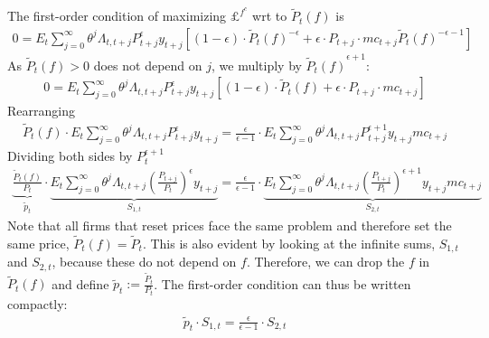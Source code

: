 \begin{enumerate}
The first-order condition of maximizing \(\pounds^{f^c}\) wrt to \(\widetilde{P}_t(f)\) is
\begin{align}
	0= E_t \sum_{j=0}^{\infty}\theta^j \Lambda_{t,t+j} P_{t+j}^\epsilon y_{t+j} \left[ (1-\epsilon)\cdot \widetilde{P}_{t}(f)^{-\epsilon}  +\epsilon \cdot P_{t+j} \cdot mc_{t+j} \widetilde{P}_{t}(f)^{-\epsilon-1}\right]
\end{align}
As \(\widetilde{P}_t(f)>0\) does not depend on \(j\), we multiply by \({\widetilde{P}_t(f)}^{\epsilon+1}\):
\begin{align}
	0= E_t \sum_{j=0}^{\infty}\theta^j \Lambda_{t,t+j} P_{t+j}^{\epsilon} y_{t+j} \left[ (1-\epsilon)\cdot\widetilde{P}_t(f) +\epsilon \cdot P_{t+j} \cdot mc_{t+j}  \right]
\end{align}
Rearranging
\begin{align}
	\widetilde{P}_t(f) \cdot E_t \sum_{j=0}^{\infty}\theta^j \Lambda_{t,t+j} P_{t+j}^{\epsilon} y_{t+j}  = \frac{\epsilon}{\epsilon-1} \cdot E_t \sum_{j=0}^{\infty}\theta^j \Lambda_{t,t+j} P_{t+j}^{\epsilon+1} y_{t+j} mc_{t+j}
\end{align}
Dividing both sides by \(P_t^{\epsilon+1}\)
\begin{align}
	\underbrace{\frac{\widetilde{P}_t(f)}{P_t}}_{\widetilde{p}_t} \cdot  \underbrace{E_t\sum_{j=0}^{\infty}\theta^j \Lambda_{t,t+j} \left(\frac{P_{t+j}}{P_t}\right)^{\epsilon} y_{t+j}}_{S_{1,t}}  = \frac{\epsilon}{\epsilon-1} \cdot \underbrace{E_t \sum_{j=0}^{\infty}\theta^j \Lambda_{t,t+j} {\left(\frac{P_{t+j}}{P_t}\right)}^{\epsilon+1} y_{t+j} mc_{t+j}}_{S_{2,t}}
\end{align}
Note that all firms that reset prices face the same problem and therefore set the same price, \(\widetilde{P}_t(f) =\widetilde{P}_t\).
This is also evident by looking at the infinite sums, \(S_{1,t}\) and \(S_{2,t}\), because these do not depend on \(f\).
Therefore, we can drop the \(f\) in \(\widetilde{P}_t(f)\) and define \(\widetilde{p}_t:= \frac{\widetilde{P}_t}{P_t}\).
The first-order condition can thus be written compactly:
\begin{align}
	\widetilde{p}_t \cdot S_{1,t} = \frac{\epsilon}{\epsilon-1} \cdot S_{2,t}
\end{align}
		

\end{enumerate}
